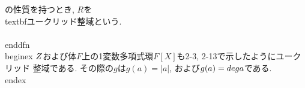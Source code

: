  の性質を持つとき, $R$を\\textbf{ユークリッド整域}という.
 \\[
  \\begin{array}{l}
   g(a)\\geq 0, g(ab)\\geq g(a);\\\\
   a, b\\in R(b\\neq 0)\\Rightarrow q, r\\in R\\text{で}a=bq+r(r=0\\text{また
    は}g(r)<g(b)). 
  \\end{array}
 \\]
\\end{dfn}
\\begin{ex}
 $\\Z$および体$F$上の1変数多項式環$F[X]$も2-3, 2-13で示したようにユークリッド
 整域である. その際の$g$は$g(a)=|a|$, および$g(a)=\\deg a$である.
\\end{ex}

